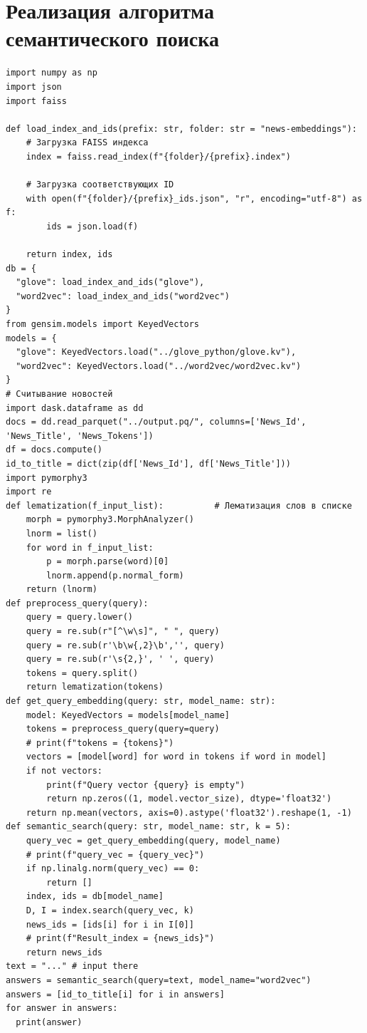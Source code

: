 \documentclass[coursework]{SCWorks}
\begin{document}
\section{Реализация алгоритма семантического поиска}
\label{apx:search}
\begin{verbatim}
import numpy as np
import json
import faiss

def load_index_and_ids(prefix: str, folder: str = "news-embeddings"):
    # Загрузка FAISS индекса
    index = faiss.read_index(f"{folder}/{prefix}.index")
    
    # Загрузка соответствующих ID
    with open(f"{folder}/{prefix}_ids.json", "r", encoding="utf-8") as f:
        ids = json.load(f)
    
    return index, ids
db = {
  "glove": load_index_and_ids("glove"),
  "word2vec": load_index_and_ids("word2vec")
}
from gensim.models import KeyedVectors
models = {
  "glove": KeyedVectors.load("../glove_python/glove.kv"),
  "word2vec": KeyedVectors.load("../word2vec/word2vec.kv")
}
# Считывание новостей
import dask.dataframe as dd
docs = dd.read_parquet("../output.pq/", columns=['News_Id', 'News_Title', 'News_Tokens'])
df = docs.compute()
id_to_title = dict(zip(df['News_Id'], df['News_Title']))
import pymorphy3
import re
def lematization(f_input_list):          # Лематизация слов в списке
    morph = pymorphy3.MorphAnalyzer()
    lnorm = list()
    for word in f_input_list:
        p = morph.parse(word)[0]
        lnorm.append(p.normal_form)
    return (lnorm)
def preprocess_query(query):
    query = query.lower()
    query = re.sub(r"[^\w\s]", " ", query)
    query = re.sub(r'\b\w{,2}\b','', query)
    query = re.sub(r'\s{2,}', ' ', query)
    tokens = query.split()
    return lematization(tokens)
def get_query_embedding(query: str, model_name: str):
    model: KeyedVectors = models[model_name]
    tokens = preprocess_query(query=query)
    # print(f"tokens = {tokens}")
    vectors = [model[word] for word in tokens if word in model]
    if not vectors:
        print(f"Query vector {query} is empty")
        return np.zeros((1, model.vector_size), dtype='float32')
    return np.mean(vectors, axis=0).astype('float32').reshape(1, -1)
def semantic_search(query: str, model_name: str, k = 5):
    query_vec = get_query_embedding(query, model_name)
    # print(f"query_vec = {query_vec}")
    if np.linalg.norm(query_vec) == 0:
        return []
    index, ids = db[model_name]
    D, I = index.search(query_vec, k)
    news_ids = [ids[i] for i in I[0]]
    # print(f"Result_index = {news_ids}")
    return news_ids
text = "..." # input there
answers = semantic_search(query=text, model_name="word2vec")
answers = [id_to_title[i] for i in answers]
for answer in answers:
  print(answer)
\end{verbatim}
\end{document}
